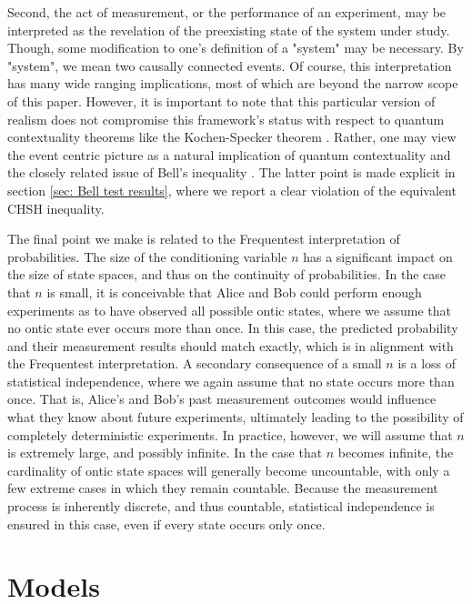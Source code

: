 \documentclass{article}
\begin{document}
Second, the act of measurement, or the performance of an experiment, may be interpreted as the revelation of the preexisting state of the system under study. Though, some modification to one's definition of a "system" may be necessary. By "system", we mean two causally connected events. Of course, this interpretation has many wide ranging implications, most of which are beyond the narrow scope of this paper. However, it is important to note that this particular version of realism does not compromise this framework's status with respect to quantum contextuality theorems like the Kochen-Specker theorem \cite{Kochen1968}. Rather, one may view the event centric picture as a natural implication of quantum contextuality and the closely related issue of Bell's inequality \cite{Clauser1969,Bell1964}. The latter point is made explicit in section \ref{sec: Bell test results}, where we report a clear violation of the equivalent CHSH inequality. 

The final point we make is related to the Frequentest interpretation of probabilities. The size of the conditioning variable $n$ has a significant impact on the size of state spaces, and thus on the continuity of probabilities. In the case that $n$ is small, it is conceivable that Alice and Bob could perform enough experiments as to have observed all possible ontic states, where we assume that no ontic state ever occurs more than once. In this case, the predicted probability and their measurement results should match exactly, which is in alignment with the Frequentest interpretation. A secondary consequence of a small $n$ is a loss of statistical independence, where we again assume that no state occurs more than once. That is, Alice's and Bob's past measurement outcomes would influence what they know about future experiments, ultimately leading to the possibility of completely deterministic experiments. In practice, however, we will assume that $n$ is extremely large, and possibly infinite. In the case that $n$ becomes infinite, the cardinality of ontic state spaces will generally become uncountable, with only a few extreme cases in which they remain countable. Because the measurement process is inherently discrete, and thus countable, statistical independence is ensured in this case, even if every state occurs only once.

\section{Models \label{sec: Models}}
\end{document}
